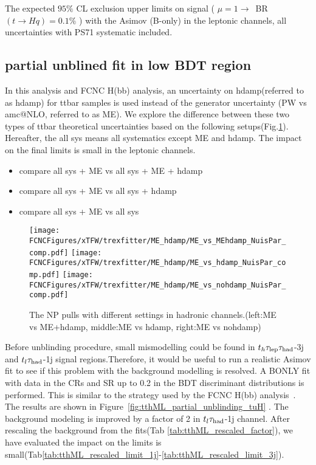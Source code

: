 \begin{table}[H]
\caption{The expected $95\%$ CL exclusion upper limits on signal ( $\mu=1\to$~BR$(t\to Hq)=0.1\%$ ) with the Asimov (B-only) in the leptonic channels, all uncertainties with PS71 systematic included.}
\label{tab:tthML_ttbarPS_vs_ttbarPS71}

\end{table}


\subsection{partial unblined fit in low BDT region}
In this analysis and FCNC H(bb) analysis, an uncertainty on hdamp(referred to as hdamp) for ttbar samples is used instead of the generator uncertainty (PW vs amc@NLO, referred to as ME). We explore the difference between these two types of ttbar theoretical uncertainties based on the following setups(Fig.\ref{fig:xTFW_ME_vs_MEhdamp}). Hereafter, the all sys means all systematics except ME and hdamp. The impact on the final limits is small in the leptonic channels. 
\begin{itemize}
	\item compare all sys + ME  vs  all sys + ME + hdamp
	\item compare all sys + ME  vs  all sys + hdamp 
	\item compare all sys + ME  vs  all sys
\end{itemize}

\begin{figure}[H]
\centering
\texttt{[image: \\FCNCFigures/xTFW/trexfitter/ME\_hdamp/ME\_vs\_MEhdamp\_NuisPar\_comp.pdf]}
\texttt{[image: \\FCNCFigures/xTFW/trexfitter/ME\_hdamp/ME\_vs\_hdamp\_NuisPar\_comp.pdf]}
\texttt{[image: \\FCNCFigures/xTFW/trexfitter/ME\_hdamp/ME\_vs\_nohdamp\_NuisPar\_comp.pdf]}
\caption{The NP pulls with different settings in hadronic channels.(left:ME vs ME+hdamp, middle:ME vs hdamp, right:ME vs nohdamp)}
\label{fig:xTFW_ME_vs_MEhdamp}
\end{figure}

		

Before unblinding procedure, small mismodelling could be found  in $t_h\tau_\text{lep}{}\tau_\text{had}$-3j and $t_l\tau_\text{had}$-1j signal regions.Therefore, it would be useful to run a realistic Asimov fit to see if this problem with the background modelling is resolved. A BONLY fit with data in the CRs and SR up to 0.2 in the BDT discriminant distributions is performed. This is similar to the strategy used by the FCNC H(bb) analysis~\cite{ANA-TOPQ-2018-41-INT1}. The results are shown in Figure~\ref{fig:tthML_partial_unblinding_tuH}
\iffalse and Figure~\ref{fig:tthML_partial_unblinding_tcH} \fi. The background modeling is improved by a factor of 2 in $t_l\tau_\text{had}$-1j channel. After rescaling the background from the fits(Tab \ref{tab:tthML_rescaled_factor}), we have evaluated the impact on the limits is small(Tab\ref{tab:tthML_rescaled_limit_1j}-\ref{tab:tthML_rescaled_limit_3j}). 


